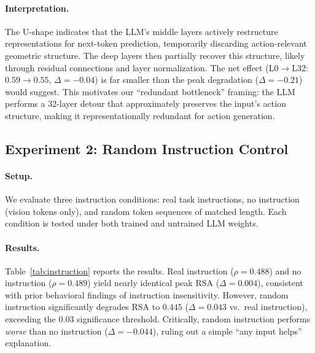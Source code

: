 \documentclass[letterpaper]{article}
\begin{document}
\paragraph{Interpretation.}
The U-shape indicates that the LLM's middle layers actively restructure representations for next-token prediction, temporarily discarding action-relevant geometric structure.
The deep layers then partially recover this structure, likely through residual connections and layer normalization.
The net effect (L0$\to$L32: $0.59\to0.55$, $\Delta=-0.04$) is far smaller than the peak degradation ($\Delta=-0.21$) would suggest.
This motivates our ``redundant bottleneck'' framing: the LLM performs a 32-layer detour that approximately preserves the input's action structure, making it representationally redundant for action generation.


\subsection{Experiment 2: Random Instruction Control}
\label{sec:exp2}

\paragraph{Setup.}
We evaluate three instruction conditions: real task instructions, no instruction (vision tokens only), and random token sequences of matched length.
Each condition is tested under both trained and untrained LLM weights.

\paragraph{Results.}
Table~\ref{tab:instruction} reports the results.
Real instruction ($\rho=0.488$) and no instruction ($\rho=0.489$) yield nearly identical peak RSA ($\Delta=0.004$), consistent with prior behavioral findings of instruction insensitivity.
However, random instruction significantly degrades RSA to $0.445$ ($\Delta=0.043$ vs.\ real instruction), exceeding the $0.03$ significance threshold.
Critically, random instruction performs \emph{worse} than no instruction ($\Delta=-0.044$), ruling out a simple ``any input helps'' explanation.
\end{document}
